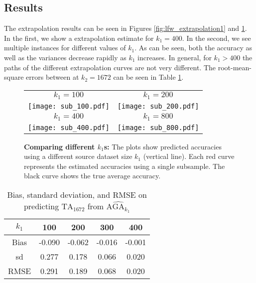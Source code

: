 \documentclass[twoside,11pt]{article}
\newenvironment{myfont}{\fontfamily{phv}\selectfont}{\par}
\begin{document}
\subsection{Results}

The extrapolation results can be seen in Figures
\ref{fig:lfw_extrapolation1} and \ref{fig:lfw_extrapolation2}. In the
first, we show a extrapolation estimate for $k_1 = 400$. In the
second, we see multiple instances for different values of $k_1$. As
can be seen, both the accuracy as well as the variances decrease
rapidly as $k_1$ increases. In general, for $k_1>400$ the paths of the
different extrapolation curves are not very different. The
root-mean-square errors between at $k_2=1672$ can be seen in Table
\ref{tab:lfw_accuracy}.

\begin{figure}
\centering
\begin{tabular}{cc}
\begin{myfont}$k_1 = 100$\end{myfont} & 
\begin{myfont}$k_1 = 200$\end{myfont}\\
\texttt{[image: sub\_100.pdf]} &
\texttt{[image: sub\_200.pdf]} \\
\begin{myfont}$k_1 = 400$\end{myfont} & 
\begin{myfont}$k_1 = 800$\end{myfont}\\
\texttt{[image: sub\_400.pdf]} &
\texttt{[image: sub\_800.pdf]} 
\end{tabular}
\caption{\textbf{Comparing different $k_1$s:}
The plots show predicted accuracies using a different source dataset size $k_1$ (vertical line). Each red curve represents the estimated accuracies using a single subsample. The black curve shows the true average accuracy. }
\label{fig:lfw_extrapolation2}
\end{figure}

\begin{table}
\centering
\begin{tabular}{c||c|c|c|c}
\hline
$k_1$ & 100 & 200 & 300 & 400 \\\hline
Bias & -0.090 & -0.062 & -0.016 & -0.001\\\hline
sd & 0.277 & 0.178 & 0.066 & 0.020 \\ \hline
RMSE & 0.291 & 0.189 & 0.068 & 0.020 \\\hline
\end{tabular}
\caption{Bias, standard deviation, and RMSE on predicting $\text{TA}_{1672}$ from $\widehat{\text{AGA}_{k_1}}$}\label{tab:lfw_accuracy}
\end{table}
\end{document}
